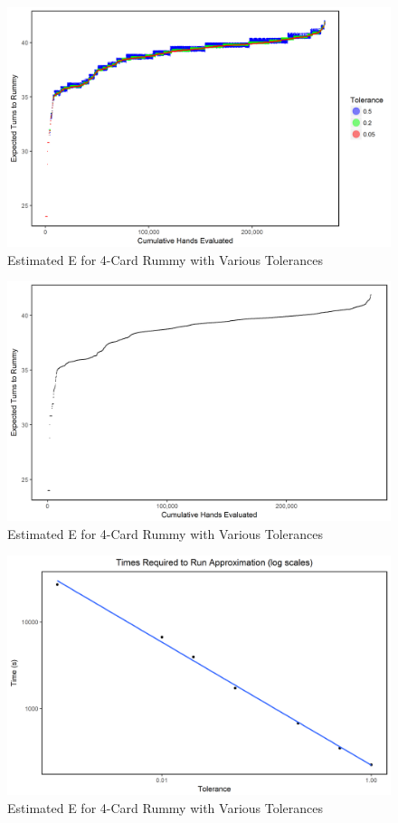 \documentclass[letter,12pt]{article}
\begin{document}
\begin{figure}
\includegraphics[width=\textwidth]{fig9.png}
\caption{Estimated E for 4-Card Rummy with Various Tolerances}\label{fig:9}
\end{figure}

\begin{figure}
\includegraphics[width=\textwidth]{fig10.png}
\caption{Estimated E for 4-Card Rummy with Various Tolerances}\label{fig:10}
\end{figure}

\begin{figure}
\includegraphics[width=\textwidth]{fig11.png}
\caption{Estimated E for 4-Card Rummy with Various Tolerances}\label{fig:11}
\end{figure}
\end{document}
